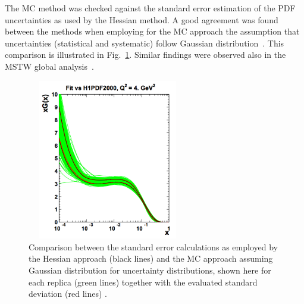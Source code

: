 \begin{description}
The MC method was checked against the standard error estimation of the PDF uncertainties as used by the Hessian method. 
A good agreement was found between the methods when employing for the MC approach the assumption that uncertainties 
(statistical and systematic) follow Gaussian distribution~\cite{hera-lhc:report2009}. 
This comparison is illustrated in Fig.~\ref{fig:mchessian}. 
Similar findings were observed also in the MSTW global analysis~\cite{Watt:2012tq}. 
\begin{figure}[!ht]
 \centering
  \includegraphics[width=7cm,height=7cm]{mchessian.pdf}
  \caption{Comparison between the standard error calculations as employed by the Hessian approach (black lines) 
      and the MC approach assuming Gaussian distribution for uncertainty distributions, shown here for each replica 
          (green lines) together with the evaluated standard deviation (red lines) \cite{hera-lhc:report2009}.}
  \label{fig:mchessian}        
\end{figure}
\end{description}

